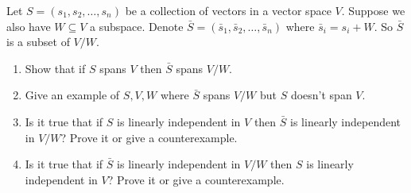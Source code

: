 \documentclass{amsart}
\begin{document}
	Let $S = (s_1, s_2, \ldots, s_n)$ be a collection of vectors in a vector space $V$.
	Suppose we also have $W \subseteq V$ a subspace.
	Denote $\bar S = (\bar s_1, \bar s_2, \ldots, \bar s_n)$ where $\bar s_i = s_i + W$.
	So $\bar S$ is a subset of $V/W$.
	\begin{enumerate}
		\item Show that if $S$ spans $V$ then $\bar S$ spans $V/W$.
		\item Give an example of $S, V, W$ where $\bar S$ spans $V/W$ but $S$ doesn't span $V$.
		\item Is it true that if $S$ is linearly independent in $V$ then $\bar S$ is linearly independent in $V/W$?
		Prove it or give a counterexample.
		\item Is it true that if $\bar S$ is linearly independent in $V/W$ then $S$ is linearly independent in $V$?
		Prove it or give a counterexample.
	\end{enumerate}
\end{document}
